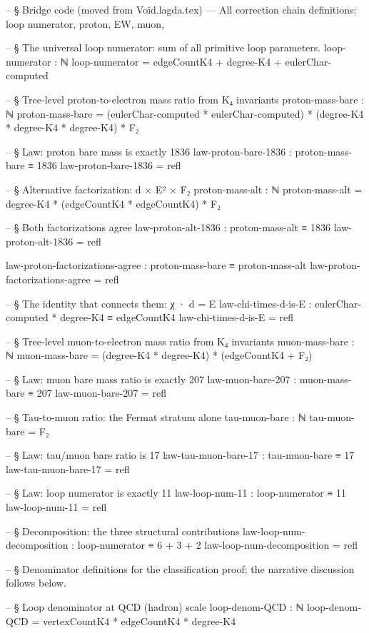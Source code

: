 \documentclass[11pt,a4paper]{book}
\begin{document}
\begin{code}
-- § Bridge code (moved from Void.lagda.tex) — All correction chain definitions: loop numerator, proton, EW, muon,

-- § The universal loop numerator: sum of all primitive loop parameters.
loop-numerator : ℕ
loop-numerator = edgeCountK4 + degree-K4 + eulerChar-computed

-- § Tree-level proton-to-electron mass ratio from K₄ invariants
proton-mass-bare : ℕ
proton-mass-bare =
  (eulerChar-computed * eulerChar-computed)
  * (degree-K4 * degree-K4 * degree-K4)
  * F₂

-- § Law: proton bare mass is exactly 1836
law-proton-bare-1836 : proton-mass-bare ≡ 1836
law-proton-bare-1836 = refl

-- § Alternative factorization: d × E² × F₂
proton-mass-alt : ℕ
proton-mass-alt = degree-K4 * (edgeCountK4 * edgeCountK4) * F₂

-- § Both factorizations agree
law-proton-alt-1836 : proton-mass-alt ≡ 1836
law-proton-alt-1836 = refl

law-proton-factorizations-agree : proton-mass-bare ≡ proton-mass-alt
law-proton-factorizations-agree = refl

-- § The identity that connects them: χ · d = E
law-chi-times-d-is-E : eulerChar-computed * degree-K4 ≡ edgeCountK4
law-chi-times-d-is-E = refl

-- § Tree-level muon-to-electron mass ratio from K₄ invariants
muon-mass-bare : ℕ
muon-mass-bare = (degree-K4 * degree-K4) * (edgeCountK4 + F₂)

-- § Law: muon bare mass ratio is exactly 207
law-muon-bare-207 : muon-mass-bare ≡ 207
law-muon-bare-207 = refl

-- § Tau-to-muon ratio: the Fermat stratum alone
tau-muon-bare : ℕ
tau-muon-bare = F₂

-- § Law: tau/muon bare ratio is 17
law-tau-muon-bare-17 : tau-muon-bare ≡ 17
law-tau-muon-bare-17 = refl

-- § Law: loop numerator is exactly 11
law-loop-num-11 : loop-numerator ≡ 11
law-loop-num-11 = refl

-- § Decomposition: the three structural contributions
law-loop-num-decomposition :
  loop-numerator ≡ 6 + 3 + 2
law-loop-num-decomposition = refl

-- § Denominator definitions for the classification proof; the narrative discussion follows below.

-- § Loop denominator at QCD (hadron) scale
loop-denom-QCD : ℕ
loop-denom-QCD = vertexCountK4 * edgeCountK4 * degree-K4


\end{code}
\end{document}
